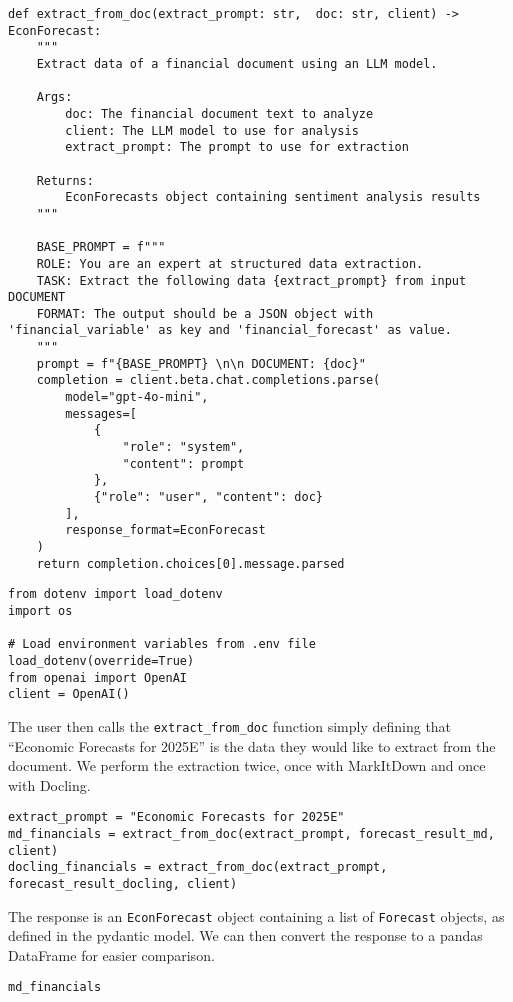 \begin{verbatim}
def extract_from_doc(extract_prompt: str,  doc: str, client) -> EconForecast:
    """
    Extract data of a financial document using an LLM model.
    
    Args:
        doc: The financial document text to analyze
        client: The LLM model to use for analysis
        extract_prompt: The prompt to use for extraction
        
    Returns:
        EconForecasts object containing sentiment analysis results
    """

    BASE_PROMPT = f"""
    ROLE: You are an expert at structured data extraction. 
    TASK: Extract the following data {extract_prompt} from input DOCUMENT
    FORMAT: The output should be a JSON object with 'financial_variable' as key and 'financial_forecast' as value.
    """
    prompt = f"{BASE_PROMPT} \n\n DOCUMENT: {doc}"
    completion = client.beta.chat.completions.parse(
        model="gpt-4o-mini",
        messages=[
            {
                "role": "system",
                "content": prompt
            },
            {"role": "user", "content": doc}
        ],
        response_format=EconForecast
    )
    return completion.choices[0].message.parsed
\end{verbatim}
\begin{verbatim}
from dotenv import load_dotenv
import os

# Load environment variables from .env file
load_dotenv(override=True)
from openai import OpenAI
client = OpenAI()
\end{verbatim}

The user then calls the \texttt{extract\_from\_doc} function simply defining that ``Economic Forecasts for 2025E'' is the data they would like to extract from the document. We perform the extraction twice, once with MarkItDown and once with Docling.

\begin{verbatim}
extract_prompt = "Economic Forecasts for 2025E"
md_financials = extract_from_doc(extract_prompt, forecast_result_md, client)
docling_financials = extract_from_doc(extract_prompt, forecast_result_docling, client)
\end{verbatim}
The response is an \texttt{EconForecast} object containing a list of \texttt{Forecast} objects, as defined in the pydantic model. We can then convert the response to a pandas DataFrame for easier comparison.

\begin{verbatim}
md_financials
\end{verbatim}


